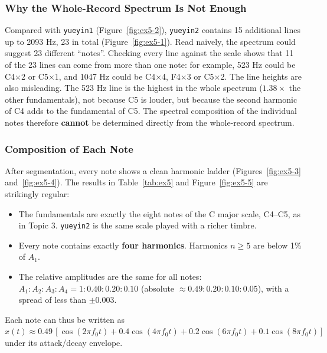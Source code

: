 \documentclass[12pt, a4paper]{article}
\begin{document}
\subsubsection{Why the Whole-Record Spectrum Is Not Enough}
Compared with \texttt{yueyin1} (Figure~\ref{fig:ex5-2}), \texttt{yueyin2} contains 15 additional lines up to 2093 Hz, 23 in total (Figure~\ref{fig:ex5-1}). Read naively, the spectrum could suggest 23 different ``notes''. Checking every line against the scale shows that 11 of the 23 lines can come from more than one note: for example, 523 Hz could be C4$\times$2 or C5$\times$1, and 1047 Hz could be C4$\times$4, F4$\times$3 or C5$\times$2. The line heights are also misleading. The 523 Hz line is the highest in the whole spectrum ($1.38\times$ the other fundamentals), not because C5 is louder, but because the second harmonic of C4 adds to the fundamental of C5. The spectral composition of the individual notes therefore \textbf{cannot} be determined directly from the whole-record spectrum.

\subsubsection{Composition of Each Note}
After segmentation, every note shows a clean harmonic ladder (Figures~\ref{fig:ex5-3} and~\ref{fig:ex5-4}). The results in Table~\ref{tab:ex5} and Figure~\ref{fig:ex5-5} are strikingly regular:
\begin{itemize}
    \item The fundamentals are exactly the eight notes of the C major scale, C4--C5, as in Topic 3. \texttt{yueyin2} is the same scale played with a richer timbre.
    \item Every note contains exactly \textbf{four harmonics}. Harmonics $n\ge5$ are below 1\% of $A_1$.
    \item The relative amplitudes are the same for all notes: $A_1:A_2:A_3:A_4=1:0.40:0.20:0.10$ (absolute $\approx0.49:0.20:0.10:0.05$), with a spread of less than $\pm0.003$.
\end{itemize}
Each note can thus be written as $x(t)\approx0.49\,[\cos(2\pi f_0t)+0.4\cos(4\pi f_0t)+0.2\cos(6\pi f_0t)+0.1\cos(8\pi f_0t)]$ under its attack/decay envelope.
\end{document}
